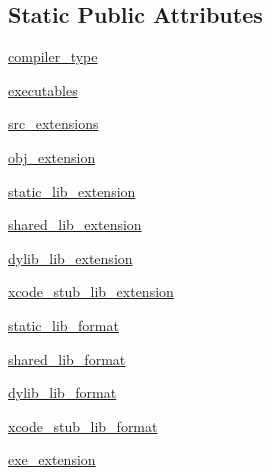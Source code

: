 \subsection*{Static Public Attributes}
\begin{DoxyCompactItemize}
\item 
\hyperlink{classsetuptools_1_1__distutils_1_1unixccompiler_1_1UnixCCompiler_a53a54960ca9be3b6f14e833ee6032e66}{compiler\+\_\+type}
\item 
\hyperlink{classsetuptools_1_1__distutils_1_1unixccompiler_1_1UnixCCompiler_a8d4dd01b02914cecb7f6800be876e522}{executables}
\item 
\hyperlink{classsetuptools_1_1__distutils_1_1unixccompiler_1_1UnixCCompiler_af30b357ee56d327cf1cfa35e97c61ddc}{src\+\_\+extensions}
\item 
\hyperlink{classsetuptools_1_1__distutils_1_1unixccompiler_1_1UnixCCompiler_ac77ab54a947c81975a1893a68564dab0}{obj\+\_\+extension}
\item 
\hyperlink{classsetuptools_1_1__distutils_1_1unixccompiler_1_1UnixCCompiler_a3de7b58407e083401c4e8c2e95a25a1d}{static\+\_\+lib\+\_\+extension}
\item 
\hyperlink{classsetuptools_1_1__distutils_1_1unixccompiler_1_1UnixCCompiler_ae84f4ae225f0fc28707ec236193ba35f}{shared\+\_\+lib\+\_\+extension}
\item 
\hyperlink{classsetuptools_1_1__distutils_1_1unixccompiler_1_1UnixCCompiler_a3d72e0b2ca9270231ee727468fc13fc6}{dylib\+\_\+lib\+\_\+extension}
\item 
\hyperlink{classsetuptools_1_1__distutils_1_1unixccompiler_1_1UnixCCompiler_a4f85497007095773c29b77d02e76be4f}{xcode\+\_\+stub\+\_\+lib\+\_\+extension}
\item 
\hyperlink{classsetuptools_1_1__distutils_1_1unixccompiler_1_1UnixCCompiler_ad0cc5c47d579064c14f0331b18193fc1}{static\+\_\+lib\+\_\+format}
\item 
\hyperlink{classsetuptools_1_1__distutils_1_1unixccompiler_1_1UnixCCompiler_a11f4dee3bf8466f5b618051fd9e06233}{shared\+\_\+lib\+\_\+format}
\item 
\hyperlink{classsetuptools_1_1__distutils_1_1unixccompiler_1_1UnixCCompiler_afddde8ece8f768265be105bed73875c7}{dylib\+\_\+lib\+\_\+format}
\item 
\hyperlink{classsetuptools_1_1__distutils_1_1unixccompiler_1_1UnixCCompiler_a55504f296a1f1209ad5fde4783fb86ce}{xcode\+\_\+stub\+\_\+lib\+\_\+format}
\item 
\hyperlink{classsetuptools_1_1__distutils_1_1unixccompiler_1_1UnixCCompiler_a181dce55eb8aac37b2bcc2b50e600f91}{exe\+\_\+extension}
\end{DoxyCompactItemize}


